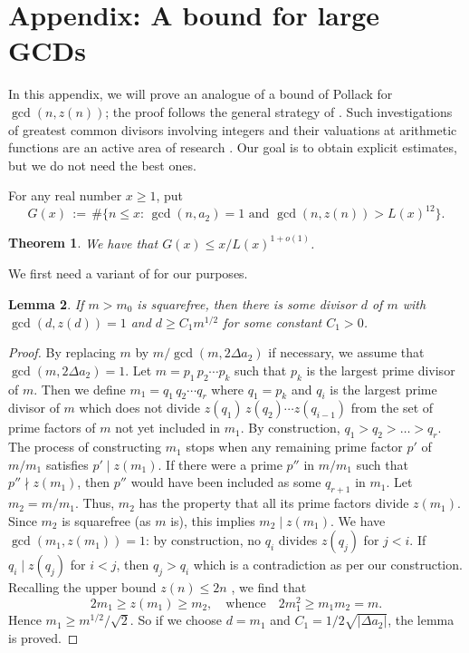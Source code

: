 \documentclass[12pt,a4paper,oneside]{amsart}
\newtheorem{theorem}{Theorem}[section]
\newtheorem{lemma}[theorem]{Lemma}
\begin{document}
\section{Appendix: A bound for large GCDs}
In this appendix, we will prove an analogue of a bound of Pollack for $\gcd(n,z(n))$; the proof follows the general strategy of \cite[Th. 1.1]{Po11}. Such investigations of greatest common divisors involving integers and their valuations at arithmetic functions are an active area of research \cite{Yu22,Po22}. Our goal is to obtain explicit estimates, but we do not need the best ones.

For any real number $x\ge 1$, put 
\[G(x) \,:=\, \#\{n \le x : \,\gcd(n,a_{2})=1\text{ and } \gcd(n,z(n))>L(x)^{12}\}.\]
\begin{theorem}\label{paul}
    We have that $G(x) \le x/L(x)^{1+o(1)}$.
\end{theorem}

We first need a variant of \cite[Lemma 2.2]{Po11} for our purposes.
\begin{lemma}\label{lemma 2.2}
If $m > m_0$ is squarefree, then there is some divisor $d$ of $m$ with $\gcd(d, z(d)) \allowbreak = 1$ and $d \ge C_1m^{1/2}$ for some constant $C_1>0$.
\end{lemma}
\begin{proof}
By replacing $m$ by $m/\gcd(m,2\Delta a_2)$ if necessary, we assume that $\gcd(m,2\Delta a_2)\allowbreak =1$.
Let $m=p_1\,p_2\cdots p_k$ such that $p_k$ is the largest prime divisor of $m$.
Then we define $m_1=q_1\,q_2\cdots q_r$ where $q_1=p_k$ and $q_i$ is the largest prime divisor of $m$ which does not divide $z(q_1)\,z(q_2)\cdots z(q_{i-1})$ from the set of prime factors of $m$ not yet included in $m_1$. By construction, $q_1 > q_2 > \dots > q_r$.
The process of constructing $m_1$ stops when any remaining prime factor $p'$ of $m/m_1$ satisfies $p' \mid z(m_1)$. If there were a prime $p''$ in $m/m_1$ such that $p'' \nmid z(m_1)$, then $p''$ would have been included as some $q_{r+1}$ in $m_1$. Let $m_2 = m/m_1$. Thus, $m_2$ has the property that all its prime factors divide $z(m_1)$. Since $m_2$ is squarefree (as $m$ is), this implies $m_2 \mid z(m_1)$.
We have $\gcd(m_1,z(m_1))=1$: by construction, no $q_i$ divides $z(q_j)$ for $j<i$. If $q_i \mid z(q_j)$ for $i<j$, then $q_j>q_i$ which is a contradiction as per our construction. 
Recalling the upper bound $z(n) \leq 2n$ \cite{Sa75}, we find that
 \[2 m_1 \geq z(m_1) \geq m_2,\quad\text{whence}\quad 2 m_1^2 \geq m_1 m_2 = m.\]
Hence $m_1 \ge m^{1/2}/\sqrt{2}$. So if we choose $d = m_1$ and $C_1=1/2\sqrt{|\Delta a_2|}$,
the lemma is proved.
\end{proof}
\end{document}
